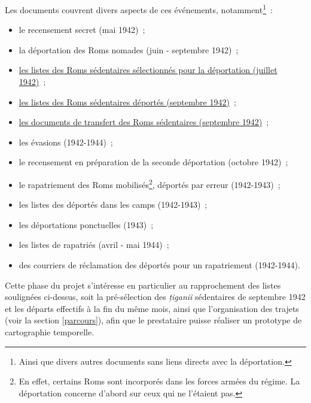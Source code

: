 \documentclass[a4paper,12pt,twoside]{book}
\begin{document}
			    Les documents couvrent divers aspects de ces événements, notamment\footnote{Ainsi que divers autres documents sans liens directs avec la déportation.}~:
                \vspace{0.5em}
			    \begin{itemize}
			        \item le recensement secret (mai 1942)~;
			        \item la déportation des Roms \og{}nomades\fg{} (juin - septembre 1942)~;
			        \item \underline{les listes des Roms \og{}sédentaires\fg{} sélectionnés pour la déportation (juillet 1942)}~;
			        \item \underline{les listes des Roms \og{}sédentaires\fg{} déportés (septembre 1942)}~;
			        \item \underline{les documents de transfert des Roms \og{}sédentaires\fg{} (septembre 1942)}~;
			        \item les évasions (1942-1944)~;
			        \item le recensement en préparation de la seconde déportation (octobre 1942)~;
			        \item le rapatriement des Roms mobilisés\footnote{En effet, certains Roms sont incorporés dans les forces armées du régime. La déportation concerne d'abord sur ceux qui ne l'étaient pas.}, déportés par erreur (1942-1943)~;
			        \item les listes des déportés dans les camps (1942-1943)~;
			        \item les déportations ponctuelles (1943)~;
			        \item les listes de rapatriés (avril - mai 1944)~;
			        \item des courriers de réclamation des déportés pour un rapatriement (1942-1944).
			    \end{itemize}
                \vspace{0.5em}
                
			    Cette phase du projet s'intéresse en particulier au rapprochement des listes soulignées ci-dessus, soit la pré-sélection des \textit{țiganii} \og{}sédentaires\fg{} de septembre 1942 et les départs effectifs à la fin du même mois, ainsi que l'organisation des trajets (voir la section \ref{parcours}), afin que le prestataire puisse réaliser un prototype de cartographie temporelle.
			    \newline
			    
\end{document}
